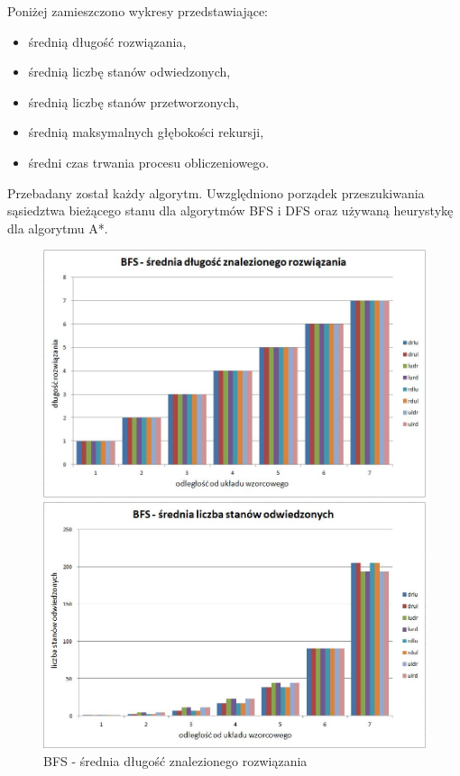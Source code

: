 \documentclass{classrep}
\begin{document}
{\color{black}
Poniżej zamieszczono wykresy przedstawiające: 
\begin{itemize}
  \item średnią długość rozwiązania,
  \item średnią liczbę stanów odwiedzonych,
  \item średnią liczbę stanów przetworzonych,
  \item średnią maksymalnych głębokości rekursji,
  \item średni czas trwania procesu obliczeniowego.\\
\end{itemize}
Przebadany został każdy algorytm. Uwzględniono porządek przeszukiwania sąsiedztwa bieżącego stanu dla algorytmów BFS i DFS oraz używaną heurystykę dla algorytmu A*.
\newpage

\begin{figure}[ht!]
	\begin{center}
		\vspace{0.3in}
		\includegraphics[scale=0.6]{bfs1}
		\caption{BFS - średnia długość znalezionego rozwiązania}
		\vspace{0.5in}
		\includegraphics[scale=0.6]{bfs2}

\end{center}
\end{figure}}
\end{document}
